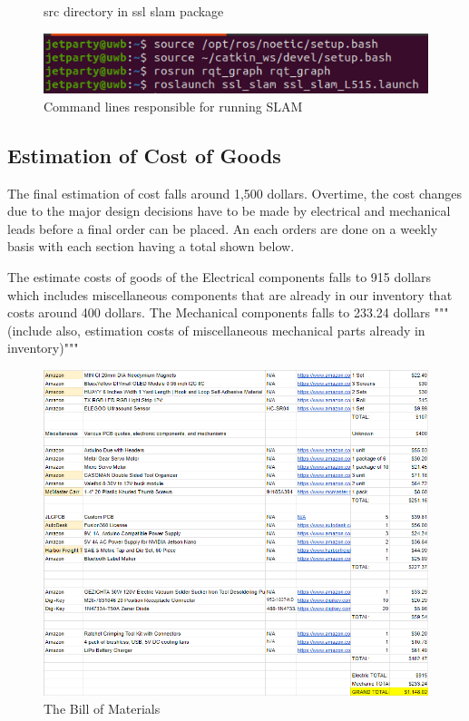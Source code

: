 \documentclass[a4paper, 10pt]{article}
\begin{document}
\begin{figure} [!h]
\begin{center}
			\end{center}
			\caption{src directory in ssl slam package}
			\label{tier3_slam_files}
			\hfill
			\begin{center}
			\includegraphics[scale=0.5]{Photos/Run SLAM.png}
			\end{center}
			\caption{Command lines responsible for running SLAM}
			\label{tier3_slam_launch}
	\end{figure}


    \clearpage
	\subsection{Estimation of Cost of Goods}
	The final estimation of cost falls around 1,500 dollars. Overtime, the cost changes due to the major design decisions have to be made by electrical and mechanical leads before a final order can be placed. An each orders are done on a weekly basis with each section having a total shown below. 
	
	The estimate costs of goods of the Electrical components falls to 915 dollars which includes miscellaneous components that are already in our inventory that costs around 400 dollars. The Mechanical components falls to 233.24 dollars """(include also, estimation costs of miscellaneous mechanical parts already in inventory)"""

	\begin{figure} [!h]
		\centering
		\includegraphics[scale=0.9]{Photos/Bills of Material}
		\caption{The Bill of Materials}
		\label{bill_of_mats}
	\end{figure}
\end{document}
